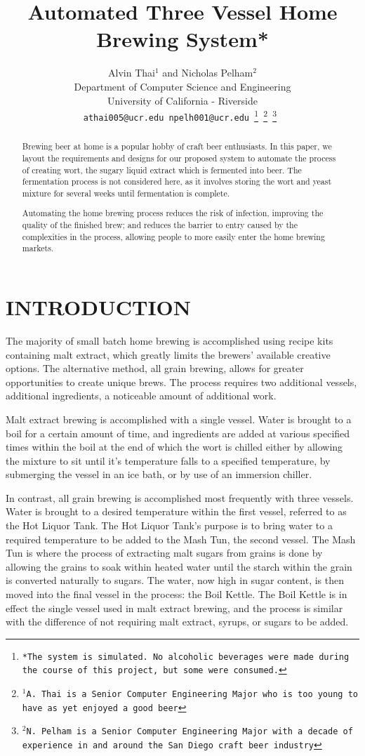 \documentclass[letterpaper, 10 pt, conference]{ieeeconf}  %
\title{\LARGE \bf
Automated Three Vessel Home Brewing System*
}
\author{Alvin Thai$^{1}$ and Nicholas Pelham$^{2}$ \\
	Department of Computer Science and Engineering \\
    University of California - Riverside \\
    \tt\small athai005@ucr.edu npelh001@ucr.edu
\thanks{*The system is simulated. No alcoholic beverages were made during the course of this project, but some were consumed.}%
\thanks{$^{1}$A. Thai is a Senior Computer Engineering Major who is too young to have as yet enjoyed a good beer}%
\thanks{$^{2}$N. Pelham is a Senior Computer Engineering Major with a decade of experience in and around the San Diego craft beer industry}%
}
\begin{document}
\maketitle
\thispagestyle{empty}
\pagestyle{empty}


\begin{abstract}

Brewing beer at home is a popular hobby of craft beer enthusiasts. In this paper, we layout the requirements and designs for our proposed system to automate the process of creating wort, the sugary liquid extract which is fermented into beer. The fermentation process is not considered here, as it involves storing the wort and yeast mixture for several weeks until fermentation is complete. 

Automating the home brewing process reduces the risk of infection, improving the quality of the finished brew; and reduces the barrier to entry caused by the complexities in the process, allowing people to more easily enter the home brewing markets.

\end{abstract}


\section{INTRODUCTION}

The majority of small batch home brewing is accomplished using recipe kits containing malt extract, which greatly limits the brewers' available creative options. The alternative method, all grain brewing, allows for greater opportunities to create unique brews. The process requires two additional vessels, additional ingredients, a noticeable amount of additional work.

Malt extract brewing is accomplished with a single vessel. Water is brought to a boil for a certain amount of time, and ingredients are added at various specified times within the boil at the end of which the wort is chilled either by allowing the mixture to sit until it's temperature falls to a specified temperature, by submerging the vessel in an ice bath, or by use of an immersion chiller.

In contrast, all grain brewing is accomplished most frequently with three vessels. Water is brought to a desired temperature within the first vessel, referred to as the Hot Liquor Tank. The Hot Liquor Tank's purpose is to bring water to a required temperature to be added to the Mash Tun, the second vessel. The Mash Tun is where the process of extracting malt sugars from grains is done by allowing the grains to soak within heated water until the starch within the grain is converted naturally to sugars. The water, now high in sugar content, is then moved into the final vessel in the process: the Boil Kettle. The Boil Kettle is in effect the single vessel used in malt extract brewing, and the process is similar with the difference of not requiring malt extract, syrups, or sugars to be added.
\end{document}
